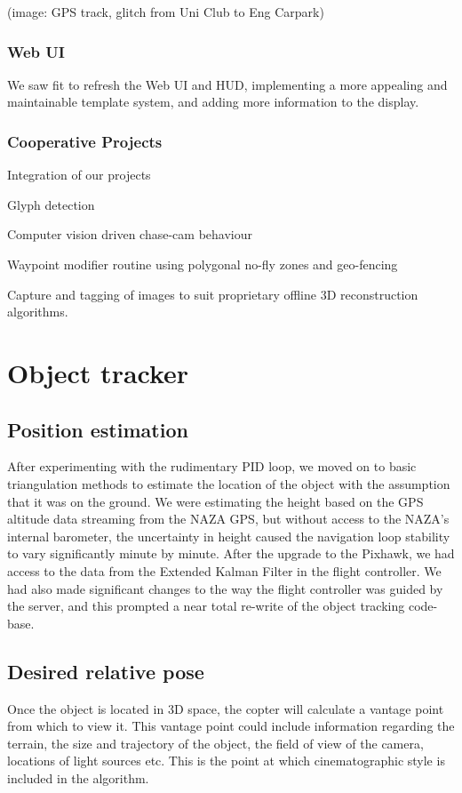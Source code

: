 \documentclass[a4paper, 11pt, titlepage]{article}
\begin{document}
    (image: GPS track, glitch from Uni Club to Eng Carpark)

    \subsubsection{Web UI}
    We saw fit to refresh the Web UI and HUD, implementing a more appealing and maintainable template system, and adding more information to the display.

    \subsubsection{Cooperative Projects}
    Integration of our projects

    Glyph detection

    Computer vision driven chase-cam behaviour

    Waypoint modifier routine using polygonal no-fly zones and geo-fencing

    Capture and tagging of images to suit proprietary offline 3D reconstruction algorithms.

\section{Object tracker}

  \subsection{Position estimation}
    After experimenting with the rudimentary PID loop, we moved on to basic triangulation methods to estimate the location of the object with the assumption that it was on the ground.  We were estimating the height based on the GPS altitude data streaming from the NAZA GPS, but without access to the NAZA's internal barometer, the uncertainty in height caused the navigation loop stability to vary significantly minute by minute.
    After the upgrade to the Pixhawk, we had access to the data from the Extended Kalman Filter in the flight controller.  We had also made significant changes to the way the flight controller was guided by the server, and this prompted a near total re-write of the object tracking code-base.

  \subsection{Desired relative pose}
    Once the object is located in 3D space, the copter will calculate a vantage point from which to view it.
    This vantage point could include information regarding the terrain, the size and trajectory of the object, the field of view of the camera, locations of light sources etc.  This is the point at which cinematographic style is included in the algorithm.
\end{document}
